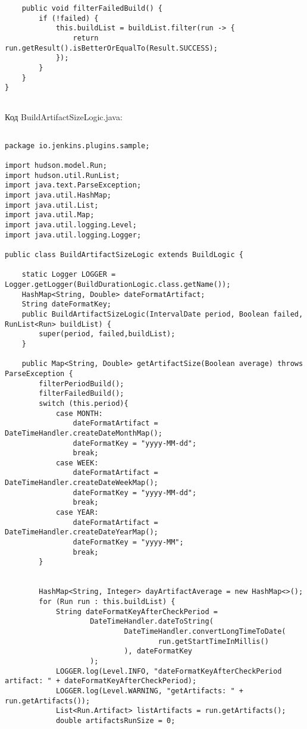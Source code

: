 \begin{lstlisting}
    public void filterFailedBuild() {
        if (!failed) {
            this.buildList = buildList.filter(run -> {
                return run.getResult().isBetterOrEqualTo(Result.SUCCESS);
            });
        }
    }
}


\end{lstlisting}

Код BuildArtifactSizeLogic.java:

\begin{lstlisting}

package io.jenkins.plugins.sample;

import hudson.model.Run;
import hudson.util.RunList;
import java.text.ParseException;
import java.util.HashMap;
import java.util.List;
import java.util.Map;
import java.util.logging.Level;
import java.util.logging.Logger;

public class BuildArtifactSizeLogic extends BuildLogic {

    static Logger LOGGER = Logger.getLogger(BuildDurationLogic.class.getName());
    HashMap<String, Double> dateFormatArtifact;
    String dateFormatKey;
    public BuildArtifactSizeLogic(IntervalDate period, Boolean failed, RunList<Run> buildList) {
        super(period, failed,buildList);
    }

    public Map<String, Double> getArtifactSize(Boolean average) throws ParseException {
        filterPeriodBuild();
        filterFailedBuild();
        switch (this.period){
            case MONTH:
                dateFormatArtifact = DateTimeHandler.createDateMonthMap();
                dateFormatKey = "yyyy-MM-dd";
                break;
            case WEEK:
                dateFormatArtifact = DateTimeHandler.createDateWeekMap();
                dateFormatKey = "yyyy-MM-dd";
                break;
            case YEAR:
                dateFormatArtifact = DateTimeHandler.createDateYearMap();
                dateFormatKey = "yyyy-MM";
                break;
        }


        HashMap<String, Integer> dayArtifactAverage = new HashMap<>();
        for (Run run : this.buildList) {
            String dateFormatKeyAfterCheckPeriod =
                    DateTimeHandler.dateToString(
                            DateTimeHandler.convertLongTimeToDate(
                                    run.getStartTimeInMillis()
                            ), dateFormatKey
                    );
            LOGGER.log(Level.INFO, "dateFormatKeyAfterCheckPeriod artifact: " + dateFormatKeyAfterCheckPeriod);
            LOGGER.log(Level.WARNING, "getArtifacts: " + run.getArtifacts());
            List<Run.Artifact> listArtifacts = run.getArtifacts();
            double artifactsRunSize = 0;


\end{lstlisting}
